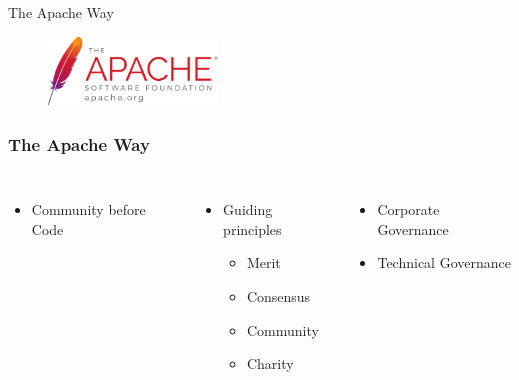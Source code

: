 \documentclass[aspectratio=169,11pt,hyperref={colorlinks=true}]{beamer}
\begin{document}
\begin{frame}[c]
  \begin{center}
      \color{white}
      \Huge The Apache Way
      \begin{figure}
        \includegraphics[width=0.4\textwidth]{pictures/asf_logo_url.pdf}
      \end{figure}
  \end{center}
\end{frame}


\begin{frame}
  \frametitle{The Apache Way}
  \begin{columns}
    \begin{itemize}
      \item{Community before Code}
    \end{itemize}
    \begin{itemize}
      \item{Guiding principles}
      \begin{itemize}
          \item{Merit}
          \item{Consensus}
          \item{Community}
          \item{Charity}
      \end{itemize}
    \end{itemize}
    \begin{itemize}
        \item{Corporate Governance}
        \item{Technical Governance}
    \end{itemize}
  \end{columns}
\end{frame}
\end{document}
